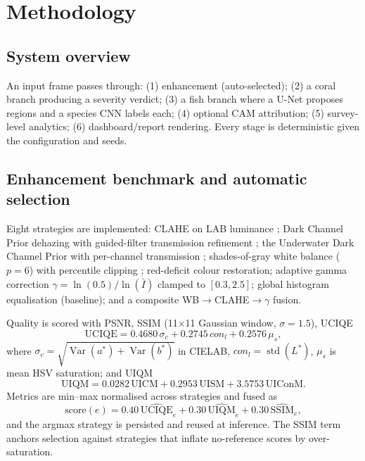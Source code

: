 \documentclass[conference]{IEEEtran}
\begin{document}
\section{Methodology}
\subsection{System overview}
An input frame passes through: (1) enhancement (auto-selected); (2) a coral branch producing a severity verdict; (3) a fish branch where a U-Net proposes regions and a species CNN labels each; (4) optional CAM attribution; (5) survey-level analytics; (6) dashboard/report rendering. Every stage is deterministic given the configuration and seeds.

\subsection{Enhancement benchmark and automatic selection}
Eight strategies are implemented: CLAHE on LAB luminance \cite{zuiderveld1994clahe}; Dark Channel Prior dehazing with guided-filter transmission refinement \cite{he2010dcp}; the Underwater Dark Channel Prior with per-channel transmission \cite{drews2013udcp}; shades-of-gray white balance ($p=6$) with percentile clipping \cite{bianco2017wb}; red-deficit colour restoration; adaptive gamma correction $\gamma=\ln(0.5)/\ln(\bar I)$ clamped to $[0.3,2.5]$; global histogram equalisation (baseline); and a composite WB$\to$CLAHE$\to\gamma$ fusion.

Quality is scored with PSNR, SSIM (11$\times$11 Gaussian window, $\sigma{=}1.5$), UCIQE \cite{yang2015uciqe}
\begin{equation}
\mathrm{UCIQE} = 0.4680\,\sigma_c + 0.2745\, con_l + 0.2576\,\mu_s,
\end{equation}
where $\sigma_c=\sqrt{\operatorname{Var}(a^*)+\operatorname{Var}(b^*)}$ in CIELAB, $con_l=\operatorname{std}(L^*)$, $\mu_s$ is mean HSV saturation; and UIQM \cite{panetta2016uiqm}
\begin{equation}
\mathrm{UIQM} = 0.0282\,\mathrm{UICM} + 0.2953\,\mathrm{UISM} + 3.5753\,\mathrm{UIConM}.
\end{equation}
Metrics are min--max normalised across strategies and fused as
\begin{equation}
\mathrm{score}(e) = 0.40\,\widehat{\mathrm{UCIQE}}_e + 0.30\,\widehat{\mathrm{UIQM}}_e + 0.30\,\widehat{\mathrm{SSIM}}_e ,
\label{eq:selection}
\end{equation}
and the argmax strategy is persisted and reused at inference. The SSIM term anchors selection against strategies that inflate no-reference scores by over-saturation.
\end{document}
